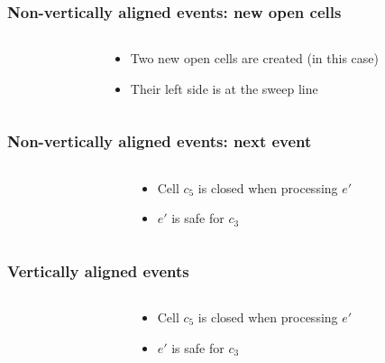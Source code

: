 \documentclass[compress]{beamer}
\begin{document}
\begin{frame}
\frametitle{Non-vertically aligned events: new open cells}
\begin{columns}
\begin{column}{0.3\textwidth}
\end{column}
\begin{column}{0.7\textwidth}
\begin{itemize}
\item Two new open cells are created (in this case)
\item Their left side is at the sweep line
\end{itemize}
\end{column}
\end{columns}
\end{frame}
\begin{frame}
\frametitle{Non-vertically aligned events: next event}
\begin{columns}
\begin{column}{0.3\textwidth}
\end{column}
\begin{column}{0.7\textwidth}
\begin{itemize}
\item Cell \(c_5\) is closed when processing \(e'\)
\item \(e'\) is safe for \(c_3\)
\end{itemize}
\end{column}
\end{columns}
\end{frame}
\begin{frame}
\frametitle{Vertically aligned events}
\begin{columns}
\begin{column}{0.3\textwidth}
\end{column}
\begin{column}{0.7\textwidth}
\begin{itemize}
\item Cell \(c_5\) is closed when processing \(e'\)
\item \(e'\) is safe for \(c_3\)
\end{itemize}
\end{column}
\end{columns}
\end{frame}
\end{document}
